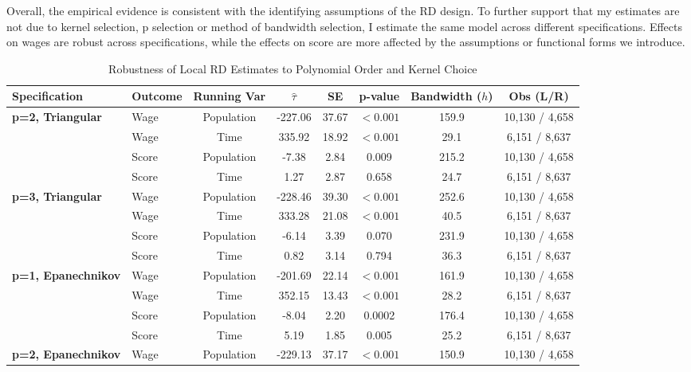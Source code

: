 \documentclass{article}
\begin{document}
Overall, the empirical evidence is consistent with the identifying assumptions of the RD design. To further support that my estimates are not due to kernel selection, p selection or method of bandwidth selection, I estimate the same model across different specifications. Effects on wages are robust across specifications, while the effects on score are more affected by the assumptions or functional forms we introduce.



\begin{table}[H]
\centering
\caption{Robustness of Local RD Estimates to Polynomial Order and Kernel Choice}
\label{tab:rd_robustness}
\begin{tabular}{llcccccc}
\hline
Specification & Outcome & Running Var & $\hat{\tau}$ & SE & p-value & Bandwidth ($h$) & Obs (L/R) \\
\hline
\textbf{p=2, Triangular} & Wage & Population & -227.06 & 37.67 & $<0.001$ & 159.9 & 10,130 / 4,658 \\
                         & Wage & Time       & 335.92  & 18.92 & $<0.001$ & 29.1  & 6,151 / 8,637 \\
                         & Score & Population & -7.38  & 2.84 & 0.009 & 215.2 & 10,130 / 4,658 \\
                         & Score & Time       & 1.27   & 2.87 & 0.658 & 24.7 & 6,151 / 8,637 \\
\textbf{p=3, Triangular} & Wage & Population & -228.46 & 39.30 & $<0.001$ & 252.6 & 10,130 / 4,658 \\
                         & Wage & Time       & 333.28  & 21.08 & $<0.001$ & 40.5  & 6,151 / 8,637 \\
                         & Score & Population & -6.14  & 3.39 & 0.070 & 231.9 & 10,130 / 4,658 \\
                         & Score & Time       & 0.82   & 3.14 & 0.794 & 36.3 & 6,151 / 8,637 \\
\textbf{p=1, Epanechnikov} & Wage & Population & -201.69 & 22.14 & $<0.001$ & 161.9 & 10,130 / 4,658 \\
                           & Wage & Time       & 352.15  & 13.43 & $<0.001$ & 28.2  & 6,151 / 8,637 \\
                           & Score & Population & -8.04  & 2.20 & 0.0002 & 176.4 & 10,130 / 4,658 \\
                           & Score & Time       & 5.19   & 1.85 & 0.005 & 25.2 & 6,151 / 8,637 \\
\textbf{p=2, Epanechnikov} & Wage & Population & -229.13 & 37.17 & $<0.001$ & 150.9 & 10,130 / 4,658 \\

\end{tabular}
\end{table}
\end{document}
